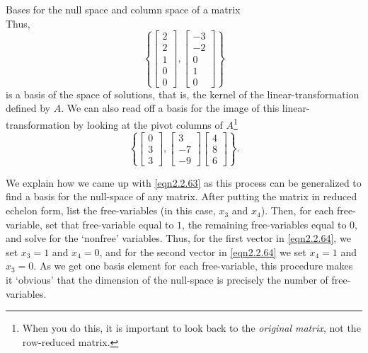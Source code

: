 \begin{exm}{Bases for the null space and column space of a matrix}{}
\begin{equation}
	\end{equation}
	Thus,
	\begin{equation}\label{eqn2.2.64}
	\left\{ \begin{bmatrix}2 \\ 2 \\ 1 \\ 0 \\ 0\end{bmatrix},\begin{bmatrix}-3 \\ -2 \\ 0 \\ 1 \\ 0\end{bmatrix}\right\}
	\end{equation}
	is a basis of the space of solutions, that is, the kernel of the linear-transformation defined by $A$.  We can also read off a basis for the image of this linear-transformation by looking at the pivot columns of $A$\footnote{When you do this, it is important to look back to the \emph{original matrix}, not the row-reduced matrix.}
	\begin{equation}
	\left\{ \begin{bmatrix}0 \\ 3 \\ 3\end{bmatrix},\begin{bmatrix}3 \\ -7 \\ -9\end{bmatrix}\begin{bmatrix}4 \\ 8 \\ 6\end{bmatrix}\right\} .
	\end{equation}
	
	We explain how we came up with \eqref{eqn2.2.63} as this process can be generalized to find a basis for the null-space of any matrix.  After putting the matrix in reduced echelon form, list the free-variables (in this case, $x_3$ and $x_4$).  Then, for each free-variable, set that free-variable equal to $1$, the remaining free-variables equal to $0$, and solve for the `nonfree' variables.  Thus, for the first vector in \eqref{eqn2.2.64}, we set $x_3=1$ and $x_4=0$, and for the second vector in \eqref{eqn2.2.64} we set $x_4=1$ and $x_3=0$.  As we get one basis element for each free-variable, this procedure makes it `obvious' that the dimension of the null-space is precisely the number of free-variables.
\end{exm}

